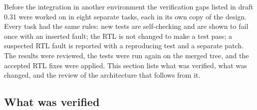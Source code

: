 \documentclass[10pt,a4paper]{article}
\begin{document}
Before the integration in another environment the verification gaps listed in draft 0.31 were worked on in eight
separate tasks, each in its own copy of the design. Every task had the same rules: new tests are self-checking
and are shown to fail once with an inserted fault; the RTL is not changed to make a test pass; a suspected RTL
fault is reported with a reproducing test and a separate patch. The results were reviewed, the tests were run
again on the merged tree, and the accepted RTL fixes were applied. This section lists what was verified, what
was changed, and the review of the architecture that follows from it.

\subsection{What was verified}
\end{document}
